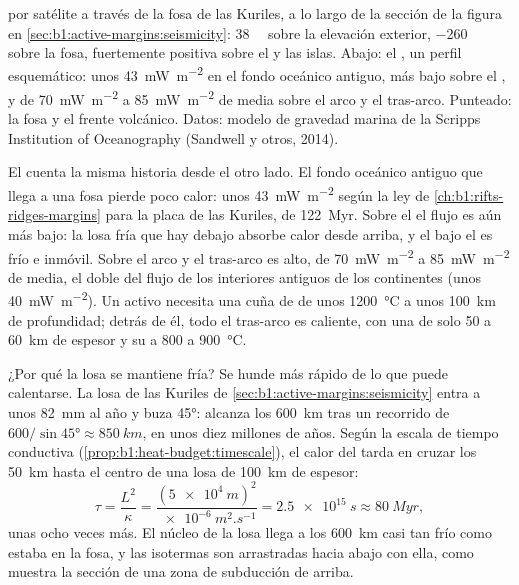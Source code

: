 \begin{omfigure}
{por satélite a través de la fosa de las Kuriles, a lo largo de la sección de la figura en \cref{sec:b1:active-margins:seismicity}:
\qty{38}{\milli\gal} sobre la elevación exterior, \qty{-260}{\milli\gal} sobre la fosa, fuertemente positiva sobre el  y las islas.
Abajo: el , un perfil esquemático: unos \qty{43}{mW.m^{-2}} en el fondo oceánico antiguo, más bajo sobre el , y de
\qty{70}{mW.m^{-2}} a \qty{85}{mW.m^{-2}} de media sobre el arco y el tras-arco. Punteado: la fosa y el frente volcánico. Datos: modelo de
gravedad marina de la Scripps Institution of Oceanography (Sandwell y otros, 2014).}
\label{fig:b1:active-margins:profiles}
\end{omfigure}

El  cuenta la misma historia desde el otro lado. El fondo oceánico antiguo que llega a una fosa pierde poco calor: unos
\qty{43}{mW.m^{-2}} según la ley de \cref{ch:b1:rifts-ridges-margins} para la placa de las Kuriles, de \qty{122}{Myr}. Sobre el  el
flujo es aún más bajo: la losa fría que hay debajo absorbe calor desde arriba, y el  bajo el  es frío e inmóvil. Sobre el arco y
el tras-arco es alto, de \qty{70}{mW.m^{-2}} a \qty{85}{mW.m^{-2}} de media, el doble del flujo de los interiores antiguos de los continentes
(unos \qty{40}{mW.m^{-2}}). Un  activo necesita una cuña de  de unos \qty{1200}{\celsius} a unos \qty{100}{km} de
profundidad; detrás de él, todo el tras-arco es caliente, con una  de solo 50 a \qty{60}{km} de espesor y su  a 800 a
\qty{900}{\celsius}.

¿Por qué la losa se mantiene fría? Se hunde más rápido de lo que puede calentarse. La losa de las Kuriles de
\cref{sec:b1:active-margins:seismicity} entra a unos \qty{82}{mm} al año y buza \ang{45}: alcanza los \qty{600}{km} tras un recorrido de
$600/\sin\ang{45} \approx \qty{850}{km}$, en unos diez millones de años. Según la escala de tiempo conductiva
(\cref{prop:b1:heat-budget:timescale}), el calor del  tarda en cruzar los \qty{50}{km} hasta el centro de una losa de \qty{100}{km} de
espesor:
\[
  \tau = \frac{L^2}{\kappa} = \frac{(\qty{5e4}{m})^2}{\qty{e-6}{m^2.s^{-1}}}
  = \qty{2.5e15}{s} \approx \qty{80}{Myr},
\]
unas ocho veces más. El núcleo de la losa llega a los \qty{600}{km} casi tan frío como estaba en la fosa, y las isotermas son arrastradas
hacia abajo con ella, como muestra la sección de una zona de subducción de arriba.

